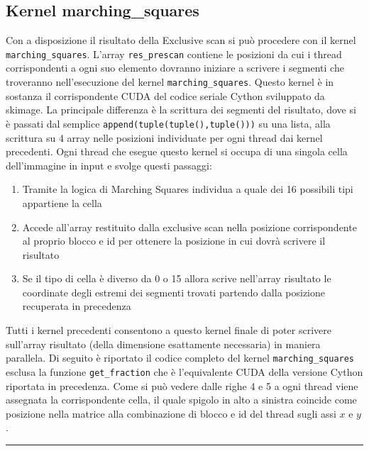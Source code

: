 \documentclass[12pt,a4paper]{report}
\begin{document}
\subsection{Kernel marching\_squares}
Con a disposizione il risultato della Exclusive scan si può procedere con il kernel \verb|marching_squares|. \newline
L'array \verb|res_prescan| contiene le posizioni da cui i thread corrispondenti a ogni suo elemento dovranno iniziare a scrivere i segmenti che troveranno nell'esecuzione del kernel \verb|marching_squares|. 
Questo kernel è in sostanza il corrispondente CUDA del codice seriale Cython sviluppato da skimage. La principale differenza è la scrittura dei segmenti del risultato, dove si è passati dal semplice \verb|append(tuple(tuple(),tuple()))| su una lista, alla scrittura su 4 array nelle posizioni individuate per ogni thread dai kernel precedenti. \newline
Ogni thread che esegue questo kernel si occupa di una singola cella dell'immagine in input e svolge questi passaggi:
\begin{enumerate}
\item Tramite la logica di Marching Squares individua a quale dei 16 possibili tipi appartiene la cella
\item Accede all'array restituito dalla exclusive scan nella posizione corrispondente al proprio blocco e id per ottenere la posizione in cui dovrà scrivere il risultato
\item Se il tipo di cella è diverso da 0 o 15 allora scrive nell'array risultato le coordinate degli estremi dei segmenti trovati partendo dalla posizione recuperata in precedenza
\end{enumerate}
Tutti i kernel precedenti consentono a questo kernel finale di poter scrivere sull'array risultato (della dimensione esattamente necessaria) in maniera parallela. \newline
Di seguito è riportato il codice completo del kernel \verb|marching_squares| esclusa la funzione \verb|get_fraction| che è l'equivalente CUDA della versione Cython riportata in precedenza. \newline
Come si può vedere dalle righe 4 e 5 a ogni thread viene assegnata la corrispondente cella, il quale spigolo in alto a sinistra coincide come posizione nella matrice alla combinazione di blocco e id del thread sugli assi $x$ e $y$.
\newpage
\noindent\rule[0.5ex]{\linewidth}{2pt}
\end{document}

